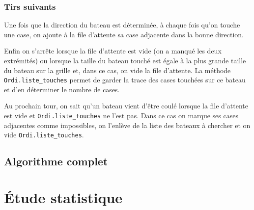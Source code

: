 \subsubsection{Tirs suivants}
Une fois que la direction du bateau est déterminée, à chaque fois qu'on touche une case, on ajoute à la file d'attente sa case adjacente dans la bonne direction.

Enfin on s'arrête lorsque la file d'attente est vide (on a manqué les deux extrémités) ou lorsque la taille du bateau touché est égale à la plus grande taille du bateau sur la grille et, dans ce cas, on vide la file d'attente. La méthode \texttt{Ordi.liste\_touches} permet de garder la trace des cases touchées sur ce bateau et d'en déterminer le nombre de cases.

Au prochain tour, on sait qu'un bateau vient d'être coulé lorsque la file d'attente est vide et \texttt{Ordi.liste\_touches} ne l'est pas. Dans ce cas on marque ses cases adjacentes comme impossibles, on l'enlève de la liste des bateaux à chercher et on vide \texttt{Ordi.liste\_touches}.
\subsection{Algorithme complet}

\section{Étude statistique}
 